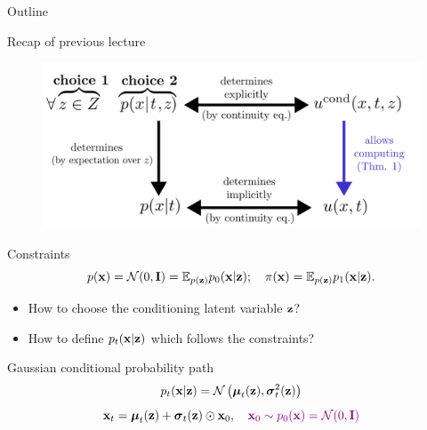 

\usepackage{tikz}

\usetikzlibrary{arrows,shapes,positioning,shadows,trees}

\begin{frame}
\titlepage
\end{frame}
\begin{frame}{Outline}
	\tableofcontents
\end{frame}
\begin{frame}{Recap of previous lecture}
	\begin{figure}
		\centering
		\includegraphics[width=0.7\linewidth]{figs/cfm_uncond_to_cond}
	\end{figure}
	\vspace{-0.3cm}
	\begin{block}{Constraints}
		\vspace{-0.3cm}
		\[
			p(\mathbf{x}) = \mathcal{N}(0, \mathbf{I}) = \mathbb{E}_{p(\mathbf{z})} p_0(\mathbf{x} | \mathbf{z}); \quad \pi(\mathbf{x}) = \mathbb{E}_{p(\mathbf{z})} p_1(\mathbf{x} | \mathbf{z}).
		\]
		\vspace{-0.5cm}
	\end{block}
	\begin{itemize}
		\item How to choose the conditioning latent variable $\mathbf{z}$?
		\item How to define $p_t(\mathbf{x} | \mathbf{z})$ which follows the constraints?
	\end{itemize}
	\begin{block}{Gaussian conditional probability path}
		\vspace{-0.3cm}
		\[
			p_t(\mathbf{x} | \mathbf{z}) = \mathcal{N}\left(\boldsymbol{\mu}_t(\mathbf{z}), \boldsymbol{\sigma}_t^2(\mathbf{z})\right)
		\]
		\[
			\mathbf{x}_t = \boldsymbol{\mu}_t(\mathbf{z}) + \boldsymbol{\sigma}_t(\mathbf{z}) \odot \mathbf{x}_0, \quad {\color{violet} \mathbf{x}_0 \sim p_0(\mathbf{x}) = \mathcal{N}(0, \mathbf{I})}
		\]
	\end{block}
\end{frame}
